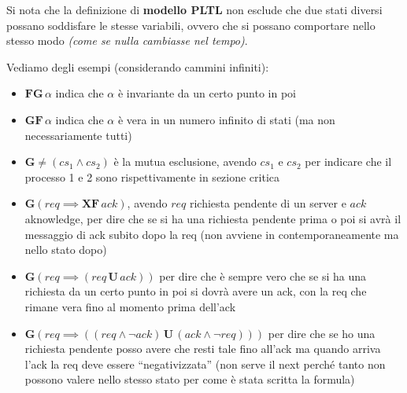 \documentclass[a4paper,12pt, oneside]{book}
\begin{document}
Si nota che la definizione di \textbf{modello PLTL} non esclude che due stati
diversi possano soddisfare le stesse variabili, ovvero che si possano comportare
nello stesso modo \textit{(come se nulla cambiasse nel tempo)}.
\begin{esempio}
  Vediamo degli esempi (considerando cammini infiniti):
  \begin{itemize}
    \item $\mathbf{FG}\,\alpha$ indica che $\alpha$ è invariante da un certo
    punto in poi
    \item $\mathbf{GF}\,\alpha$ indica che $\alpha$ è vera in un numero infinito
    di stati (ma non necessariamente tutti)
    \item $\mathbf{G}\neq (cs_1\land cs_2)$ è la mutua esclusione, avendo $cs_1$
    e $cs_2$ per indicare che il processo 1 e 2 sono rispettivamente in sezione
    critica 
    \item $\mathbf{G}(req\implies\mathbf{XF}\,ack)$, avendo $req$ richiesta
    pendente di un server e $ack$ aknowledge, per dire che se si ha una
    richiesta pendente prima o poi si avrà il messaggio di ack subito dopo la
    req (non avviene in contemporaneamente ma nello stato dopo)
    \item $\mathbf{G}(req\implies(req\,\mathbf{U}\,ack))$ per dire che è sempre
    vero che se si ha una richiesta da un certo punto in poi si dovrà avere un
    ack, con la req che rimane vera fino al momento prima dell'ack
    \item $\mathbf{G}(req\implies((req\land \neg ack)\,\mathbf{U}\,(ack\land\neg
    req)))$ per dire che se ho una richiesta pendente posso avere che resti tale
    fino all'ack ma quando arriva l'ack la req deve essere ``negativizzata''
    (non serve il next perché tanto non possono valere nello stesso stato per
    come è stata scritta la formula)
  \end{itemize}
\end{esempio}
\end{document}
